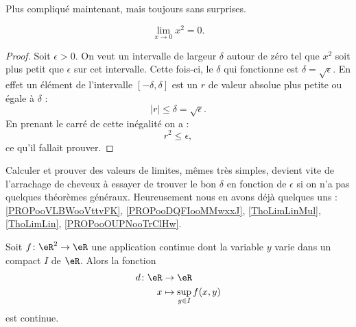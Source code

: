 Plus compliqué maintenant, mais toujours sans surprises.

\begin{proposition}
	\[
		\lim_{x\to 0}x^2=0.
	\]

\end{proposition}

\begin{proof}
	Soit \( \epsilon>0\). On veut un intervalle de largeur \( \delta\) autour de zéro tel que \( x^2\) soit plus petit que \( \epsilon\) sur cet intervalle. Cette fois-ci, le \( \delta\) qui fonctionne est \( \delta=\sqrt{\epsilon}\). En effet un élément de l'intervalle \( [-\delta,\delta]\) est un \( r\) de valeur absolue plus petite ou égale à \( \delta\) :
	\[
		| r |\leq\delta=\sqrt{\epsilon}.
	\]
	En prenant le carré de cette inégalité on a :
	\[
		r^2\leq\epsilon,
	\]
	ce qu'il fallait prouver.
\end{proof}

Calculer et prouver des valeurs de limites, mêmes très simples, devient vite de l'arrachage de cheveux à essayer de trouver le bon \( \delta\) en fonction de \( \epsilon\) si on n'a pas quelques théorèmes généraux. Heureusement nous en avons déjà quelques uns : \ref{PROPooVLBWooVttvFK}, \ref{PROPooDQFIooMMwxxJ}, \ref{ThoLimLinMul}, \ref{ThoLimLin}, \ref{PROPooOUPNooTrClHw}.

\begin{proposition}      \label{PROPooWXBAooAEweSF}
	Soit \( f\colon \eR^2\to \eR\) une application continue dont la variable \( y\) varie dans un compact \( I\) de \( \eR\). Alors la fonction
	\begin{equation}
		\begin{aligned}
			d\colon \eR & \to \eR                      \\
			x           & \mapsto \sup_{y\in I} f(x,y)
		\end{aligned}
	\end{equation}
	est continue.
\end{proposition}

